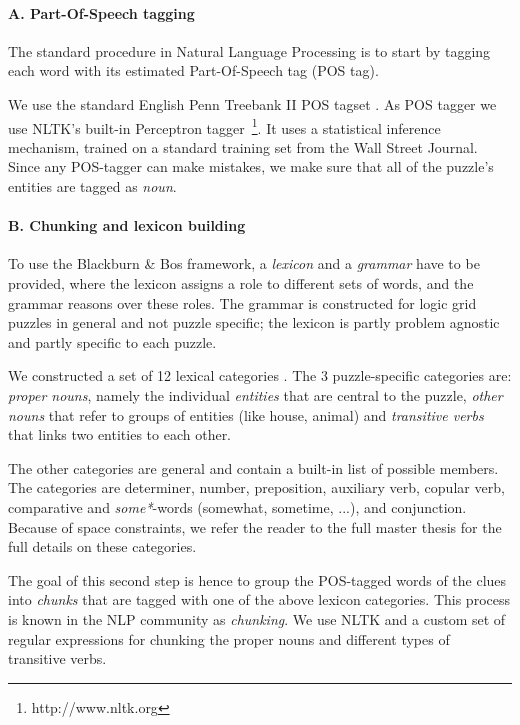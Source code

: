\paragraph{A. Part-Of-Speech tagging}
The standard procedure in Natural Language Processing is to start by tagging each word with its estimated Part-Of-Speech tag (POS tag). %

We use the standard English Penn Treebank II POS tagset \cite{DBLP:journals/coling/MarcusSM94}. As POS tagger we use NLTK's built-in Perceptron tagger~\footnote{http://www.nltk.org}. It uses a statistical inference mechanism, trained on a standard training set from the Wall Street Journal. 
Since any POS-tagger can make mistakes, we make sure that all of the puzzle's entities are tagged as \textit{noun}.

\paragraph{B. Chunking and lexicon building}
To use the Blackburn \& Bos framework, a \textit{lexicon} and a \textit{grammar} have to be provided, where the lexicon assigns a role to different sets of words, and the grammar reasons over these roles. The grammar is constructed for logic grid puzzles in general and not puzzle specific; the lexicon is partly problem agnostic and partly specific to each puzzle.

We constructed a set of 12 lexical categories \cite{msc/Claes17}. The 3 puzzle-specific categories are: \textit{proper nouns}, namely the individual \textit{entities} that are central to the puzzle, \textit{other nouns} that refer to groups of entities (like house, animal) and \textit{transitive verbs} that links two entities to each other.

The other categories are general and contain a built-in list of possible members. The categories are determiner, number, preposition, auxiliary verb, copular verb, comparative and \textit{some*}-words (somewhat, sometime, ...), and conjunction. Because of space constraints, we refer the reader to the full master thesis for the full details on these categories.


The goal of this second step is hence to group the POS-tagged words of the clues into \textit{chunks} that are tagged with one of the above lexicon categories. This process is known in the NLP community as \textit{chunking}. We use NLTK and a custom set of regular expressions for chunking the proper nouns and different types of transitive verbs. %

